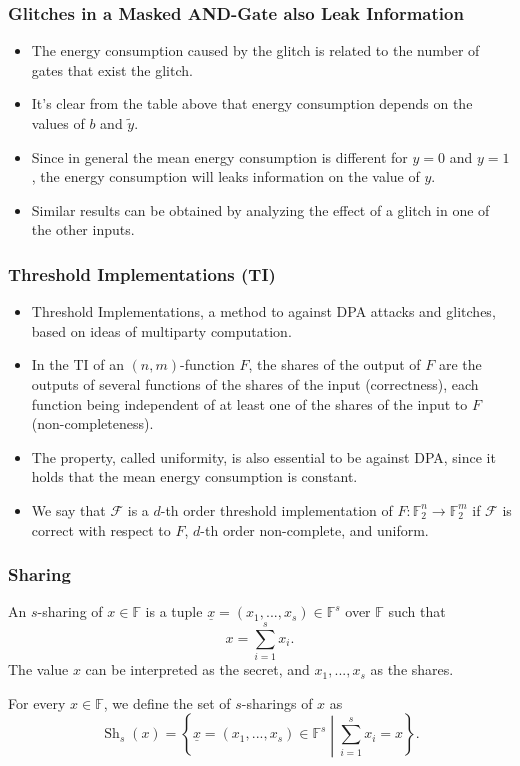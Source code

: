 \documentclass[
    aspectratio=169,                   %
]{beamer}
\newcommand{\F}{\mathbb{F}}
\begin{document}
    \begin{frame}
        \frametitle{Glitches in a Masked AND-Gate also Leak Information}
        \begin{itemize}
            \item The energy consumption caused by the glitch is related to the number of gates that exist the glitch. 
            \item It's clear from the table above that energy consumption depends on the values of $ b $ and $ \widetilde{y} $. 
            \item Since in general the mean energy consumption is different for $ y=0 $ and $ y=1 $, 
            the energy consumption will leaks information on the value of $ y $. 
            \item Similar results can be obtained by analyzing the effect of a glitch in one of the other inputs. 
        \end{itemize}
            
    \end{frame}

    \begin{frame}
        \frametitle{Threshold Implementations (TI)}
        \begin{itemize}
            \item Threshold Implementations, a method to against DPA attacks and glitches, based on ideas of multiparty computation. 
            \item In the TI of an $ (n,m) $-function $ F $,  the shares of the output of $ F $ are the outputs of several functions of the shares of the input (correctness), each function being independent of at least one of the shares of the input to $ F $ (non-completeness). 
            \item The property, called uniformity, is also essential to be against DPA, since it holds that the mean 
            energy consumption is constant. 
            \item We say that $ \mathcal{F} $ is a $ d $-th order threshold implementation of $ F: \F_2^n\rightarrow \F_2^m $ if $ \mathcal{F} $ is correct with respect to $ F $, $ d $-th order non-complete, and uniform.
        \end{itemize}
    \end{frame}

    \begin{frame}
        \frametitle{Sharing}
        
        \begin{definition}
            An $ s $-sharing of $ x\in\F $ is a tuple $ \underline{x}=(x_1,...,x_s)\in\F^s $ over $ \F $ such that 
            \[x=\sum_{i=1}^{s}x_i.\]
            The value $ x $ can be interpreted as the secret, and $ x_1,...,x_s $ as the shares.
        \end{definition}
        
        For every $ x\in\F $, we define the set of $ s $-sharings of $ x $ as 
        \[\operatorname{Sh}_s(x)=\left\{ \underline{x}=(x_1,...,x_s)\in\F^s\middle|\sum_{i=1}^{s}x_i=x \right\}.\]
        
    \end{frame}
\end{document}
